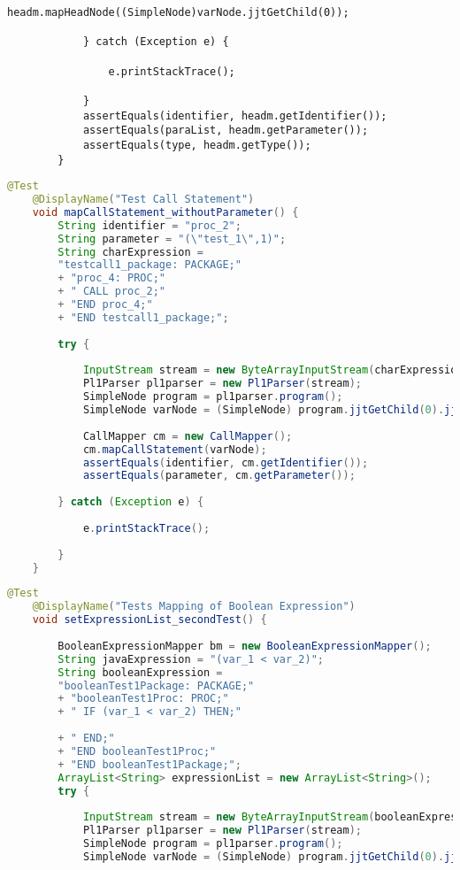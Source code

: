 \begin{appendices}
\begin{lstlisting}[language=PL/I, caption=Proc-Head Test]
				headm.mapHeadNode((SimpleNode)varNode.jjtGetChild(0));
				
			} catch (Exception e) {
				
				e.printStackTrace();
				
			}
			assertEquals(identifier, headm.getIdentifier());
			assertEquals(paraList, headm.getParameter());
			assertEquals(type, headm.getType());
		}		
	\end{lstlisting}
\pagebreak
	\begin{lstlisting}[language=Java, caption=Call-Statement Test]
	@Test
	@DisplayName("Test Call Statement")
	void mapCallStatement_withoutParameter() {
		String identifier = "proc_2";
		String parameter = "(\"test_1\",1)";
		String charExpression = 
		"testcall1_package: PACKAGE;" 
		+ "proc_4: PROC;"
		+ "	CALL proc_2;" 
		+ "END proc_4;" 
		+ "END testcall1_package;";
		
		try {
			
			InputStream stream = new ByteArrayInputStream(charExpression.getBytes(StandardCharsets.UTF_8));
			Pl1Parser pl1parser = new Pl1Parser(stream);
			SimpleNode program = pl1parser.program();
			SimpleNode varNode = (SimpleNode) program.jjtGetChild(0).jjtGetChild(1).jjtGetChild(1).jjtGetChild(0);
			
			CallMapper cm = new CallMapper();
			cm.mapCallStatement(varNode);
			assertEquals(identifier, cm.getIdentifier());
			assertEquals(parameter, cm.getParameter());
			
		} catch (Exception e) {
			
			e.printStackTrace();
			
		}
	}
	\end{lstlisting}
\pagebreak
	\begin{lstlisting}[language=Java,caption=Boolean-Expression Test]
	@Test
	@DisplayName("Tests Mapping of Boolean Expression")
	void setExpressionList_secondTest() {
		
		BooleanExpressionMapper bm = new BooleanExpressionMapper();
		String javaExpression = "(var_1 < var_2)";
		String booleanExpression = 
		"booleanTest1Package: PACKAGE;"
		+ "booleanTest1Proc: PROC;"
		+ "	IF (var_1 < var_2) THEN;"
		
		+ "	END;"
		+ "END booleanTest1Proc;"
		+ "END booleanTest1Package;";
		ArrayList<String> expressionList = new ArrayList<String>();
		try {
			
			InputStream stream = new ByteArrayInputStream(booleanExpression.getBytes(StandardCharsets.UTF_8));
			Pl1Parser pl1parser = new Pl1Parser(stream);
			SimpleNode program = pl1parser.program();
			SimpleNode varNode = (SimpleNode) program.jjtGetChild(0).jjtGetChild(1).jjtGetChild(1).jjtGetChild(0).jjtGetChild(0);
			

\end{lstlisting}
\end{appendices}
